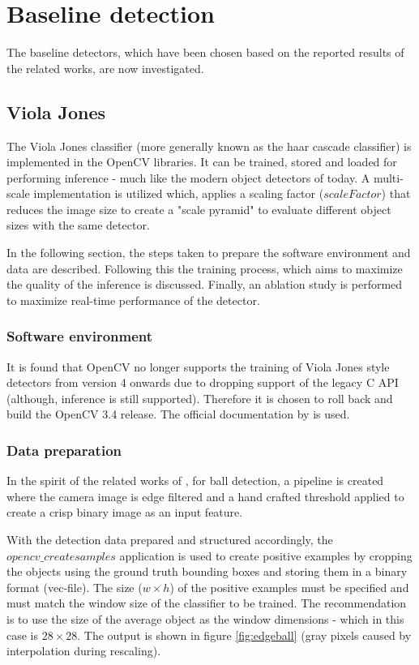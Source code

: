 \documentclass[a4paper,twoside,12pt]{report}
\begin{document}
\section{Baseline detection}

The baseline detectors, which have been chosen based on the reported results of the related works, are now investigated.

\subsection{Viola Jones}

The Viola Jones classifier (more generally known as the haar cascade classifier) is implemented in the OpenCV libraries. It can be trained, stored and loaded for performing inference - much like the modern object detectors of today. A multi-scale implementation is utilized which, applies a scaling factor ($scaleFactor$) that reduces the image size to create a "scale pyramid" to evaluate different object sizes with the same detector. 

In the following section, the steps taken to prepare the software environment and data are described. Following this the training process, which aims to maximize the quality of the inference is discussed. Finally, an ablation study is performed to maximize real-time performance of the detector.

\subsubsection{Software environment}

It is found that OpenCV no longer supports the training of Viola Jones style detectors from version 4 onwards due to dropping support of the legacy C API (although, inference is still supported). Therefore it is chosen to roll back and build the OpenCV 3.4 release. The official documentation by \cite{vjdataset} is used.

\subsubsection{Data preparation}

In the spirit of the related works of \cite{robovj}, for ball detection, a pipeline is created where the camera image is edge filtered and a hand crafted threshold applied to create a crisp binary image as an input feature. 

With the detection data prepared and structured accordingly, the $opencv\_createsamples$ application is used to create positive examples by cropping the objects using the ground truth bounding boxes and storing them in a binary format (vec-file). The size ($w\times h$) of the positive examples must be specified and must match the window size of the classifier to be trained. The \cite{vjdataset} recommendation is to use the size of the average object as the window dimensions - which in this case is $28\times 28$. The output is shown in figure \ref{fig:edgeball} (gray pixels caused by interpolation during rescaling).
\end{document}
